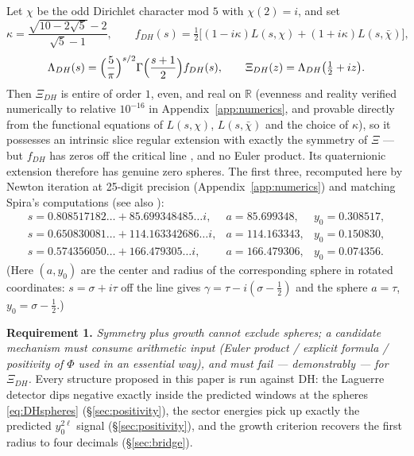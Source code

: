 \documentclass[11pt]{amsart}
\theoremstyle{plain}
\theoremstyle{definition}
\theoremstyle{remark}
\newcommand{\RR}{\mathbb{R}}
\begin{document}
Let $\chi$ be the odd Dirichlet character mod $5$ with $\chi(2)=i$, and set
\[
\kappa=\frac{\sqrt{10-2\sqrt5}-2}{\sqrt5-1},\qquad
f_{DH}(s)=\tfrac12\bigl[(1-i\kappa)L(s,\chi)+(1+i\kappa)L(s,\bar\chi)\bigr],
\]
\[
\Lambda_{DH}(s)=\Bigl(\frac{5}{\pi}\Bigr)^{s/2}\Gamma\Bigl(\frac{s+1}{2}\Bigr)f_{DH}(s),
\qquad \Xi_{DH}(z)=\Lambda_{DH}\bigl(\tfrac12+iz\bigr).
\]
Then $\Xi_{DH}$ is entire of order $1$, even, and real on $\RR$ (evenness and reality verified
numerically to relative $10^{-16}$ in Appendix~\ref{app:numerics}, and provable directly from
the functional equations of $L(s,\chi)$, $L(s,\bar\chi)$ and the choice of $\kappa$), so it
possesses an intrinsic slice regular extension
with exactly the symmetry of $\Xi$ --- but $f_{DH}$ has zeros off the critical line
\cite{DavenportHeilbronn1936a,DavenportHeilbronn1936b,Titchmarsh1986}, and no Euler product. Its
quaternionic extension therefore has genuine zero spheres. The first three, recomputed here by
Newton iteration at 25-digit precision (Appendix~\ref{app:numerics}) and matching Spira's
computations \cite{Spira1994} (see also \cite{BalanzarioSanchez2007}):
\begin{equation}\label{eq:DHspheres}
\begin{array}{lll}
s=0.808517182\ldots+85.699348485\ldots i, & a=85.699348, & y_0=0.308517,\\
s=0.650830081\ldots+114.163342686\ldots i, & a=114.163343, & y_0=0.150830,\\
s=0.574356050\ldots+166.479305\ldots i, & a=166.479306, & y_0=0.074356 .
\end{array}
\end{equation}
(Here $(a,y_0)$ are the center and radius of the corresponding sphere in rotated coordinates:
$s=\sigma+i\tau$ off the line gives $\gamma=\tau- i(\sigma-\tfrac12)$ and the sphere
$a=\tau$, $y_0=\sigma-\tfrac12$.)

\textbf{Requirement 1.} \emph{Symmetry plus growth cannot exclude spheres; a candidate mechanism
must consume arithmetic input (Euler product / explicit formula / positivity of $\Phi$ used in an
essential way), and must fail --- demonstrably --- for $\Xi_{DH}$.} Every structure proposed in
this paper is run against DH: the Laguerre detector dips negative exactly inside the predicted
windows at the spheres \eqref{eq:DHspheres} (\S\ref{sec:positivity}), the sector energies pick up
exactly the predicted $y_0^{2\ell}$ signal (\S\ref{sec:positivity}), and the growth criterion
recovers the first radius to four decimals (\S\ref{sec:bridge}).
\end{document}
